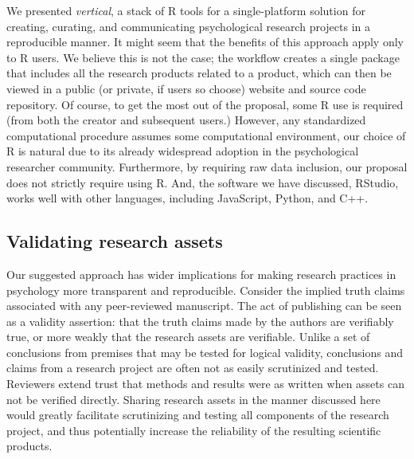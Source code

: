 \documentclass[
  english,
  jou,floatsintext]{apa6}
\begin{document}
We presented \emph{vertical}, a stack of R tools for a single-platform solution for creating, curating, and communicating psychological research projects in a reproducible manner. It might seem that the benefits of this approach apply only to R users. We believe this is not the case; the workflow creates a single package that includes all the research products related to a product, which can then be viewed in a public (or private, if users so choose) website and source code repository. Of course, to get the most out of the proposal, some R use is required (from both the creator and subsequent users.) However, any standardized computational procedure assumes some computational environment, our choice of R is natural due to its already widespread adoption in the psychological researcher community. Furthermore, by requiring raw data inclusion, our proposal does not strictly require using R. And, the software we have discussed, RStudio, works well with other languages, including JavaScript, Python, and C++.

\hypertarget{validating-research-assets}{%
\subsection{Validating research assets}\label{validating-research-assets}}

Our suggested approach has wider implications for making research practices in psychology more transparent and reproducible. Consider the implied truth claims associated with any peer-reviewed manuscript. The act of publishing can be seen as a validity assertion: that the truth claims made by the authors are verifiably true, or more weakly that the research assets are verifiable. Unlike a set of conclusions from premises that may be tested for logical validity, conclusions and claims from a research project are often not as easily scrutinized and tested. Reviewers extend trust that methods and results were as written when assets can not be verified directly. Sharing research assets in the manner discussed here would greatly facilitate scrutinizing and testing all components of the research project, and thus potentially increase the reliability of the resulting scientific products.
\end{document}
